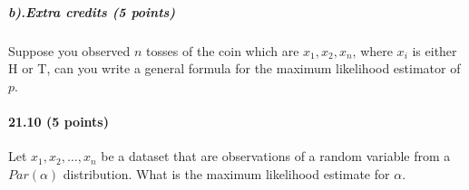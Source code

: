 \documentclass{article} %
\begin{document}
\subparagraph*{b).Extra credits (5 points)} Suppose you observed $n$ tosses of the coin which are $x_1, x_2, x_n$, where $x_i$ is either H or T, can you write a general formula for the maximum likelihood estimator of $p$.

\paragraph*{21.10 (5 points)} Let $x_1, x_2, \ldots, x_n$ be a dataset that are observations of a random variable from a $Par(\alpha)$ distribution. What is the maximum likelihood estimate for $\alpha$. 
%
\end{document}
